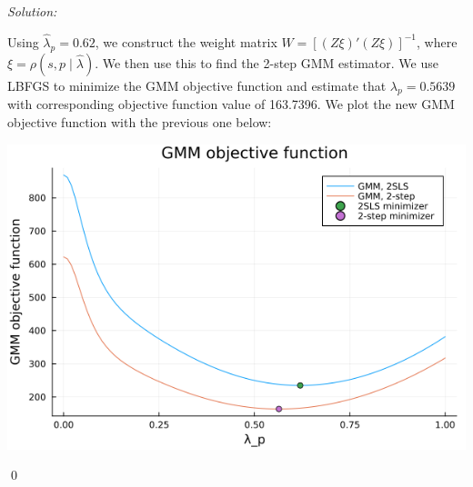 \documentclass[12pt]{article}
\newenvironment{problem}[2][Problem]{\begin{trivlist}
\item[\hskip \labelsep {\bfseries #1}\hskip \labelsep {\bfseries #2.}]}{\end{trivlist}}
\newenvironment{sol}
    {\emph{Solution:}
    }
    {
    \qed
    }
\begin{document}
\begin{problem}{3}
\end{problem}
\begin{sol}
    Using $\hat{\lambda}_p = 0.62$, we construct the weight matrix $W = [(Z \xi)' ( Z \xi) ]^{-1}$, where $\xi = \rho(s, p \mid \hat{\lambda})$. We then use this to find the 2-step GMM estimator. We use LBFGS to minimize the GMM objective function and estimate that $\lambda_p = 0.5639$ with corresponding objective function value of 163.7396. We plot the new GMM objective function with the previous one below:
    \begin{center}
        \includegraphics[scale=0.5]{gmm2step.png}
    \end{center}
\end{sol}
\end{document}
